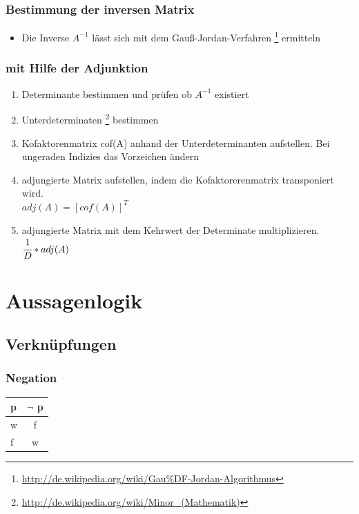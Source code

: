 \documentclass[a4paper,12pt]{scrartcl}
\begin{document}
\subsubsection{Bestimmung der inversen Matrix}
\begin{itemize}
\item Die Inverse $A^{-1}$ lässt sich mit dem Gauß-Jordan-Verfahren \footnote{\url{http://de.wikipedia.org/wiki/Gau\%DF-Jordan-Algorithmus}} ermitteln
\end{itemize}

\subsubsection{mit Hilfe der Adjunktion}
\begin{enumerate}
\item Determinante bestimmen und prüfen ob  $A^{-1}$ existiert
\item Unterdeterminaten \footnote{\url{http://de.wikipedia.org/wiki/Minor_(Mathematik)}} bestimmen
\item Kofaktorenmatrix cof(A) anhand der Unterdeterminanten aufstellen. Bei ungeraden Indizies das Vorzeichen ändern
\item adjungierte Matrix aufstellen, indem die Kofaktorerenmatrix transponiert wird. \\ $adj(A) = [cof(A)]^T$
\item adjungierte Matrix mit dem Kehrwert der Determinate multiplizieren. \\ $\cfrac{1}{D} * adj(A)$
\end{enumerate}

\newpage
\section{Aussagenlogik}
\subsection{Verknüpfungen}

\subsubsection{Negation}
\begin{tabular}{l|c}
  p & $\neg$ p\\
  \hline
  w & f \\
  f & w \\
\end{tabular}
\end{document}
